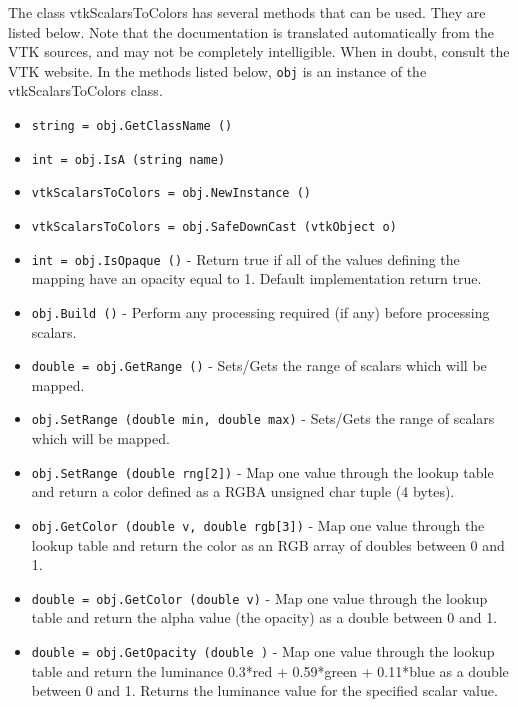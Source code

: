 The class vtkScalarsToColors has several methods that can be used.
  They are listed below.
Note that the documentation is translated automatically from the VTK sources,
and may not be completely intelligible.  When in doubt, consult the VTK website.
In the methods listed below, \verb|obj| is an instance of the vtkScalarsToColors class.
\begin{itemize}
\item  \verb|string = obj.GetClassName ()|

\item  \verb|int = obj.IsA (string name)|

\item  \verb|vtkScalarsToColors = obj.NewInstance ()|

\item  \verb|vtkScalarsToColors = obj.SafeDownCast (vtkObject o)|

\item  \verb|int = obj.IsOpaque ()| -  Return true if all of the values defining the mapping have an opacity
 equal to 1. Default implementation return true.

\item  \verb|obj.Build ()| -  Perform any processing required (if any) before processing 
 scalars.

\item  \verb|double = obj.GetRange ()| -  Sets/Gets the range of scalars which will be mapped.

\item  \verb|obj.SetRange (double min, double max)| -  Sets/Gets the range of scalars which will be mapped.

\item  \verb|obj.SetRange (double rng[2])| -  Map one value through the lookup table and return a color defined
 as a RGBA unsigned char tuple (4 bytes).

\item  \verb|obj.GetColor (double v, double rgb[3])| -  Map one value through the lookup table and return the color as
 an RGB array of doubles between 0 and 1.

\item  \verb|double = obj.GetColor (double v)| -  Map one value through the lookup table and return the alpha value
 (the opacity) as a double between 0 and 1.

\item  \verb|double = obj.GetOpacity (double )| -  Map one value through the lookup table and return the luminance
 0.3*red + 0.59*green + 0.11*blue as a double between 0 and 1.
 Returns the luminance value for the specified scalar value.


\end{itemize}
